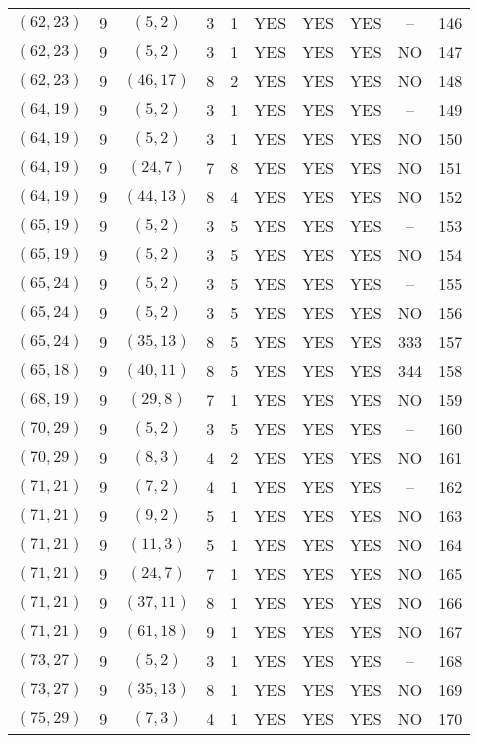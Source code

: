 \begin{longtable}{|c|c|c|c|c|c|c|c|c|c|}
$(62, 23)$ & 9 & $(5, 2)$ & 3 & 1 & YES & YES & YES & -- & 146\\
$(62, 23)$ & 9 & $(5, 2)$ & 3 & 1 & YES & YES & YES & NO & 147\\
$(62, 23)$ & 9 & $(46, 17)$ & 8 & 2 & YES & YES & YES & NO & 148\\
$(64, 19)$ & 9 & $(5, 2)$ & 3 & 1 & YES & YES & YES & -- & 149\\
$(64, 19)$ & 9 & $(5, 2)$ & 3 & 1 & YES & YES & YES & NO & 150\\
$(64, 19)$ & 9 & $(24, 7)$ & 7 & 8 & YES & YES & YES & NO & 151\\
$(64, 19)$ & 9 & $(44, 13)$ & 8 & 4 & YES & YES & YES & NO & 152\\
$(65, 19)$ & 9 & $(5, 2)$ & 3 & 5 & YES & YES & YES & -- & 153\\
$(65, 19)$ & 9 & $(5, 2)$ & 3 & 5 & YES & YES & YES & NO & 154\\
$(65, 24)$ & 9 & $(5, 2)$ & 3 & 5 & YES & YES & YES & -- & 155\\
$(65, 24)$ & 9 & $(5, 2)$ & 3 & 5 & YES & YES & YES & NO & 156\\
$(65, 24)$ & 9 & $(35, 13)$ & 8 & 5 & YES & YES & YES & 333 & 157\\
$(65, 18)$ & 9 & $(40, 11)$ & 8 & 5 & YES & YES & YES & 344 & 158\\
$(68, 19)$ & 9 & $(29, 8)$ & 7 & 1 & YES & YES & YES & NO & 159\\
$(70, 29)$ & 9 & $(5, 2)$ & 3 & 5 & YES & YES & YES & -- & 160\\
$(70, 29)$ & 9 & $(8, 3)$ & 4 & 2 & YES & YES & YES & NO & 161\\
$(71, 21)$ & 9 & $(7, 2)$ & 4 & 1 & YES & YES & YES & -- & 162\\
$(71, 21)$ & 9 & $(9, 2)$ & 5 & 1 & YES & YES & YES & NO & 163\\
$(71, 21)$ & 9 & $(11, 3)$ & 5 & 1 & YES & YES & YES & NO & 164\\
$(71, 21)$ & 9 & $(24, 7)$ & 7 & 1 & YES & YES & YES & NO & 165\\
$(71, 21)$ & 9 & $(37, 11)$ & 8 & 1 & YES & YES & YES & NO & 166\\
$(71, 21)$ & 9 & $(61, 18)$ & 9 & 1 & YES & YES & YES & NO & 167\\
$(73, 27)$ & 9 & $(5, 2)$ & 3 & 1 & YES & YES & YES & -- & 168\\
$(73, 27)$ & 9 & $(35, 13)$ & 8 & 1 & YES & YES & YES & NO & 169\\
$(75, 29)$ & 9 & $(7, 3)$ & 4 & 1 & YES & YES & YES & NO & 170\\

\end{longtable}
